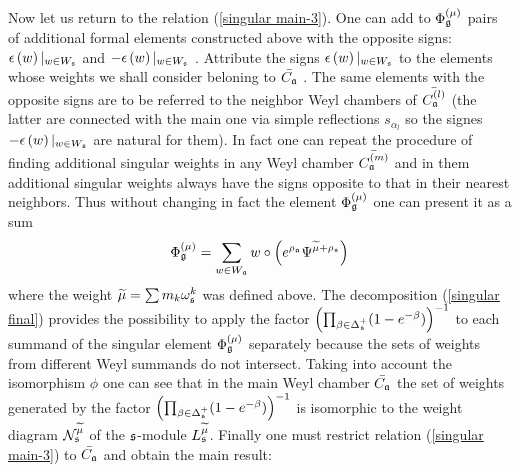 \documentclass[12pt]{article}
\begin{document}
Now let us return to the relation (\ref{singular main-3}). One can add to $%
\Phi _{\frak{g}}^{\left( \mu \right) }$ pairs of additional formal elements
constructed above  with the opposite signs: $\epsilon \left( w\right)
|_{w\in W_{\frak{s}}}$ and $-\epsilon \left( w\right) |_{w\in W_{\frak{s}}}$%
. Attribute the signs $\epsilon \left( w\right) |_{w\in W_{\frak{s}}}$ to
the elements whose weights we shall consider beloning to $\bar{C_{\frak{a}}}$%
. The same elements with the opposite signs are to be referred to the
neighbor Weyl chambers of $\bar{C_{\frak{a}}^{(l)}}$ (the latter are
connected with the main one via simple reflections $s_{\alpha _{l}}$ so the
signes $-\epsilon \left( w\right) |_{w\in W_{\frak{s}}}$ are natural for
them). In fact one can repeat the procedure of finding additional singular
weights in any Weyl chamber $\bar{C_{\frak{a}}^{(m)}}$ and in them
additional singular weights always have the signs opposite to that in their
nearest neighbors. Thus without changing in fact the element $\Phi _{\frak{g}%
}^{\left( \mu \right) }$ one can present it as a sum
\begin{equation}
\Phi _{\frak{g}}^{\left( \mu \right) }=\sum_{w\in W_{\frak{a}}}w\circ \left(
e^{\rho _{\frak{a}}}\Psi ^{\widetilde{\mu }+\rho _{\frak{s}}}\right)
\label{singular final}
\end{equation}
where the weight $\widetilde{\mu }=\sum m_{k}\omega _{\frak{s}}^{k}$ was
defined above. The decomposition (\ref{singular final}) provides the
possibility to apply the factor $\left( \prod_{\beta \in \Delta _{\frak{s}%
}^{+}}(1-e^{-\beta })\right) ^{-1}$ to each summand of the singular element $%
\Phi _{\frak{g}}^{\left( \mu \right) }$ separately because the sets of
weights from different Weyl summands do not intersect. Taking into account
the isomorphism $\phi $ one can see that in the main Weyl chamber $\bar{C_{%
\frak{a}}}$ the set of weights generated by the factor $\left( \prod_{\beta
\in \Delta _{\frak{s}}^{+}}(1-e^{-\beta })\right) ^{-1}$ is isomorphic to
the weight diagram $\mathcal{N}_{\frak{s}}^{\widetilde{\mu }}$ of the $\frak{%
s}$-module $L_{\frak{s}}^{\widetilde{\mu }}$. Finally one must restrict
relation (\ref{singular main-3}) to $\bar{C_{\frak{a}}}$ and obtain the main
result:
\end{document}
